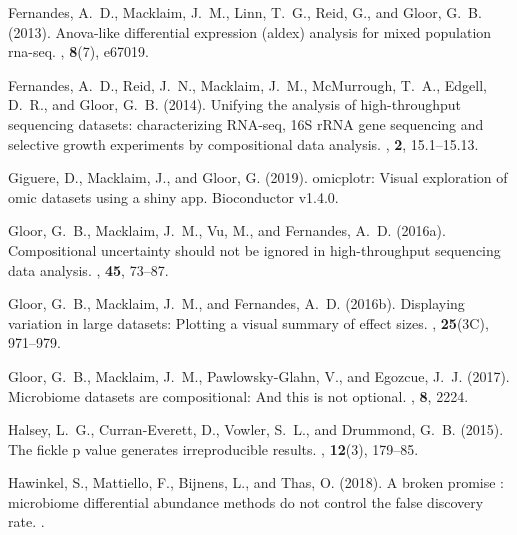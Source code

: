 \documentclass{bioinfo}
\begin{document}
\begin{thebibliography}{}
Fernandes, A.~D., Macklaim, J.~M., Linn, T.~G., Reid, G., and Gloor, G.~B.
  (2013).
\newblock Anova-like differential expression (aldex) analysis for mixed
  population rna-seq.
, {\bf 8}(7), e67019.

Fernandes, A.~D., Reid, J.~N., Macklaim, J.~M., McMurrough, T.~A., Edgell,
  D.~R., and Gloor, G.~B. (2014).
\newblock Unifying the analysis of high-throughput sequencing datasets:
  characterizing {RNA}-seq, 16{S} r{RNA} gene sequencing and selective growth
  experiments by compositional data analysis.
, {\bf 2}, 15.1--15.13.

Giguere, D., Macklaim, J., and Gloor, G. (2019).
\newblock omicplotr: Visual exploration of omic datasets using a shiny app.
\newblock Bioconductor v1.4.0.

Gloor, G.~B., Macklaim, J.~M., Vu, M., and Fernandes, A.~D. (2016a).
\newblock Compositional uncertainty should not be ignored in high-throughput
  sequencing data analysis.
, {\bf 45}, 73--87.

Gloor, G.~B., Macklaim, J.~M., and Fernandes, A.~D. (2016b).
\newblock Displaying variation in large datasets: Plotting a visual summary of
  effect sizes.
, {\bf
  25}(3C), 971--979.

Gloor, G.~B., Macklaim, J.~M., Pawlowsky-Glahn, V., and Egozcue, J.~J. (2017).
\newblock Microbiome datasets are compositional: And this is not optional.
, {\bf 8}, 2224.

Halsey, L.~G., Curran-Everett, D., Vowler, S.~L., and Drummond, G.~B. (2015).
\newblock The fickle p value generates irreproducible results.
, {\bf 12}(3), 179--85.

Hawinkel, S., Mattiello, F., Bijnens, L., and Thas, O. (2018).
\newblock A broken promise : microbiome differential abundance methods do not
  control the false discovery rate.
.


\end{thebibliography}
\end{document}
